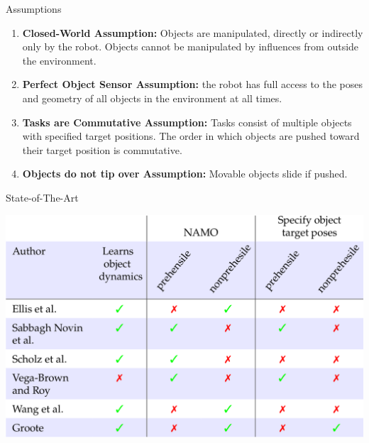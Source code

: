 \begin{frame}[fragile]{Assumptions}
\begin{block}{}
\begin{enumerate}
  \item \textbf{Closed-World Assumption:} Objects are manipulated, directly or indirectly only by the robot. Objects cannot be manipulated by influences from outside the environment.\\\pause
\item\textbf{Perfect Object Sensor Assumption:} the robot has full access to the poses and geometry of all objects in the environment at all times.\\\pause
\item\textbf{Tasks are Commutative Assumption:} Tasks consist of multiple objects with specified target positions. The order in which objects are pushed toward their target position is commutative.\\\pause
\item\textbf{Objects do not tip over Assumption:} Movable objects slide if pushed.\\\pause
\end{enumerate}
\end{block}
\end{frame}


\begin{frame}[fragile]{State-of-The-Art}
\begin{center}
  \includegraphics[width=1.0\textwidth]{figures/introduction/sota}
\end{center}
\end{frame}



